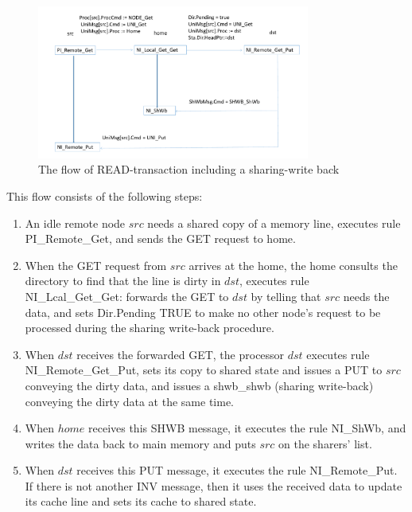 \documentclass{llncs-new}
\begin{document}
\vspace{-15pt}
\begin{figure}[htbp]
\centering
\includegraphics[width=0.8\textwidth]{flow2.pdf}
\vspace{-20pt}
\caption{The flow of READ-transaction including a sharing-write back\label{fig:arch}}
\end{figure}
\vspace{-20pt}
This flow consists of the following steps:
\begin{enumerate}
\item An idle remote node $src$ needs a shared copy of a memory line, executes   rule PI\_Remote\_Get, and  sends the GET request to home.

\item  When the GET request from $src$ arrives at the
home, the home consults the directory to find that the line is dirty in $dst$,  executes rule NI\_Lcal\_Get\_Get: forwards the GET to $dst$ by telling that $src$ needs the data, and sets Dir.Pending TRUE to make no  other node's request to be processed during the sharing write-back procedure.

\item  When $dst$ receives the forwarded GET, the
processor $dst$ executes rule \\
NI\_Remote\_Get\_Put, sets its copy to shared state and issues a PUT to $src$ conveying the dirty data,  and  issues a   shwb\_shwb
 (sharing write-back) conveying the dirty data at the same time.

\item   When $home$ receives this SHWB message, it executes the rule NI\_ShWb, and
 writes the
data back  to main memory and puts $src$ on the sharers' list.

\item When $dst$ receives this PUT message, it executes the rule NI\_Remote\_Put. If there is not another INV message, then it   uses the received data to update its cache line and sets its cache to shared state.


\end{enumerate}
\end{document}
